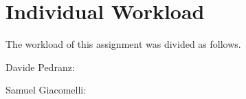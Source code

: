 \section{Individual Workload}
The workload of this assignment was divided as follows.

Davide Pedranz:

Samuel Giacomelli:

